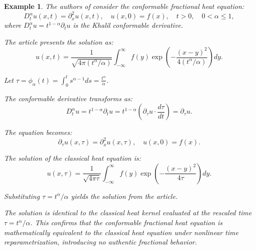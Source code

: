 \documentclass[preprint,12pt]{elsarticle}
\newtheorem{example}{Example}
\begin{document}
\begin{example}  The authors of \cite{3} consider the conformable fractional heat equation:
\[
D^\alpha_t u(x,t) = \partial_x^2 u(x,t), \quad u(x,0) = f(x), \quad t > 0, \quad 0 < \alpha \leq 1,
\]
where \( D^\alpha_t u = t^{1-\alpha} \partial_t u \) is the Khalil conformable derivative.

The article presents the solution as:
\[
u(x,t) = \frac{1}{\sqrt{4\pi (t^\alpha / \alpha)}} \int_{-\infty}^\infty f(y) \exp\left( -\frac{(x-y)^2}{4 (t^\alpha / \alpha)} \right) dy.
\]

 Let \( \tau = \phi_\alpha(t) = \int_0^t s^{\alpha-1} ds = \frac{t^\alpha}{\alpha} \).

   The conformable derivative transforms as:
   \[
   D^\alpha_t u = t^{1-\alpha} \partial_t u = t^{1-\alpha} \left( \partial_\tau u \cdot \frac{d\tau}{dt} \right) = \partial_\tau u.
   \]

   The equation becomes:
   \[
   \partial_\tau u(x,\tau) = \partial_x^2 u(x,\tau), \quad u(x,0) = f(x).
   \]

   The solution of the classical heat equation is:
   \[
   u(x,\tau) = \frac{1}{\sqrt{4\pi \tau}} \int_{-\infty}^\infty f(y) \exp\left( -\frac{(x-y)^2}{4\tau} \right) dy.
   \]

   Substituting \( \tau = t^\alpha / \alpha \) yields the solution from the article.

The solution is identical to the classical heat kernel evaluated at the rescaled time \( \tau = t^\alpha / \alpha \). This confirms that the conformable fractional heat equation is mathematically equivalent to the classical heat equation under nonlinear time reparametrization, introducing no authentic fractional behavior.
\end{example}
\end{document}
